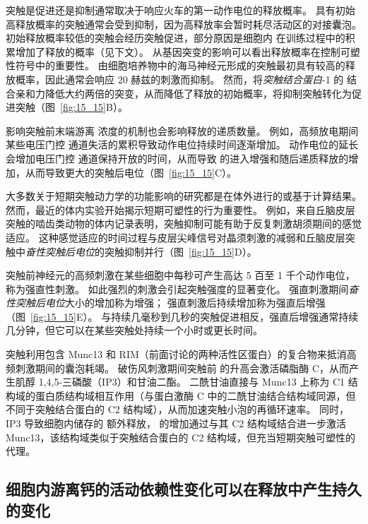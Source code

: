 突触是促进还是抑制通常取决于响应火车的第一动作电位的释放概率。
具有初始高释放概率的突触通常会受到抑制，因为高释放率会暂时耗尽活动区的对接囊泡。
初始释放概率较低的突触会经历突触促进，部分原因是细胞内  在训练过程中的积累增加了释放的概率（见下文）。
从基因突变的影响可以看出释放概率在控制可塑性符号中的重要性。
由细胞培养物中的海马神经元形成的突触最初具有较高的释放概率，因此通常会响应 20 赫兹的刺激而抑制。
然而，将\textit{突触结合蛋白}-1 的  结合亲和力降低大约两倍的突变，从而降低了释放的初始概率，将抑制突触转化为促进突触（图~\ref{fig:15_15}B）。


影响突触前末端游离  浓度的机制也会影响释放的递质数量。
例如，高频放电期间某些电压门控  通道失活的累积导致动作电位持续时间逐渐增加。
动作电位的延长会增加电压门控  通道保持开放的时间，从而导致  的进入增强和随后递质释放的增加，从而导致更大的突触后电位（图~\ref{fig:15_15}C）。


大多数关于短期突触动力学的功能影响的研究都是在体外进行的或基于计算结果。
然而，最近的体内实验开始揭示短期可塑性的行为重要性。
例如，来自丘脑皮层突触的啮齿类动物的体内记录表明，突触抑制可能有助于反复刺激胡须期间的感觉适应。
这种感觉适应的时间过程与皮层尖峰信号对晶须刺激的减弱和丘脑皮层突触中\textit{奋性突触后电位}的突触抑制并行（图~\ref{fig:15_15}D）。


突触前神经元的高频刺激在某些细胞中每秒可产生高达 5 百至 1 千个动作电位，称为强直性刺激。
如此强烈的刺激会引起突触强度的显著变化。
强直刺激期间\textit{奋性突触后电位}大小的增加称为增强；
强直刺激后持续增加称为强直后增强（图~\ref{fig:15_15}E）。
与持续几毫秒到几秒的突触促进相反，强直后增强通常持续几分钟，但它可以在某些突触处持续一个小时或更长时间。


突触利用包含 Munc13 和 RIM（前面讨论的两种活性区蛋白）的复合物来抵消高频刺激期间的囊泡耗竭。
破伤风刺激期间突触前  的升高会激活磷脂酶 C，从而产生肌醇 1,4,5-三磷酸（IP3）和甘油二酯。
二酰甘油直接与 Munc13 上称为 C1 结构域的蛋白质结构域相互作用（与蛋白激酶 C 中的二酰甘油结合结构域同源，但不同于突触结合蛋白的 C2 结构域），从而加速突触小泡的再循环速率。
同时，IP3 导致细胞内储存的  额外释放， 的增加通过与其 C2 结构域结合进一步激活 Munc13，该结构域类似于突触结合蛋白的 C2 结构域，但充当短期突触可塑性的代理。



\subsection{细胞内游离钙的活动依赖性变化可以在释放中产生持久的变化}

